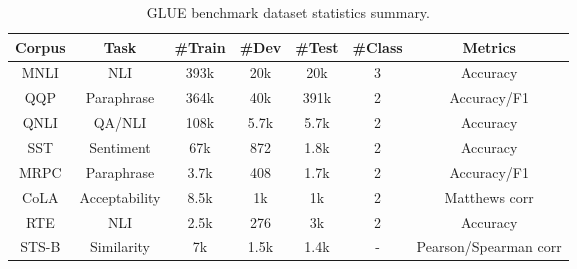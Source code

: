 \documentclass{article} \usepackage{iclr2021_conference,times}
\theoremstyle{plain}
\begin{document}
\begin{table}[h]
    \centering
    	\setlength{\tabcolsep}{6pt}
	\def\arraystretch{1.05}
    \begin{tabular}{c||c|c|c|c|c|c} \hline
        \toprule[1.2pt]
        \textbf{Corpus} & \textbf{Task} & \textbf{\#Train} & \textbf{\#Dev} & \textbf{\#Test} & \textbf{\#Class} & \textbf{Metrics} \\ \hline
        MNLI & NLI  & 393k & 20k & 20k & 3 & Accuracy \\ \hline
        QQP & Paraphrase  & 364k & 40k & 391k & 2 & Accuracy/F1 \\ \hline
        QNLI & QA/NLI  & 108k & 5.7k & 5.7k & 2 & Accuracy \\ \hline
        SST & Sentiment & 67k & 872 & 1.8k & 2 & Accuracy \\ \hline
        MRPC & Paraphrase & 3.7k & 408 & 1.7k & 2 & Accuracy/F1 \\ \hline
        CoLA & Acceptability & 8.5k & 1k & 1k & 2 & Matthews corr \\ \hline
        RTE & NLI & 2.5k & 276 & 3k & 2 & Accuracy \\ \hline
        STS-B & Similarity & 7k & 1.5k & 1.4k & - & Pearson/Spearman corr \\ 
        \bottomrule[1.2pt]
    \end{tabular}
    \caption{GLUE benchmark dataset statistics summary.}
    \label{tab:data}
\end{table}
\end{document}
